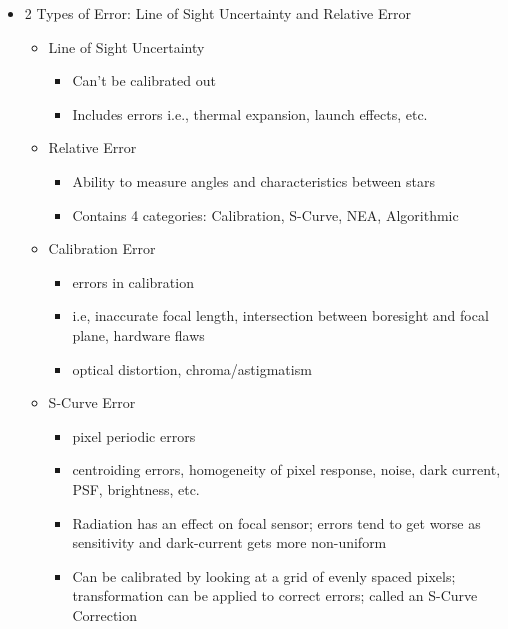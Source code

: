 \begin{itemize}
    \item 2 Types of Error: Line of Sight Uncertainty and Relative Error
    \begin{itemize}
        \item Line of Sight Uncertainty
        \begin{itemize}
            \item Can't be calibrated out
            \item Includes errors i.e., thermal expansion, launch effects, etc.
        \end{itemize}
    \end{itemize}
    \begin{itemize}
        \item Relative Error
        \begin{itemize}
            \item Ability to measure angles and characteristics between stars 
            \item Contains 4 categories: Calibration, S-Curve, NEA, Algorithmic
        \end{itemize}
    \end{itemize}
    \begin{itemize}
        \item Calibration Error
        \begin{itemize}
            \item errors in calibration
            \item i.e, inaccurate focal length, intersection between boresight and focal plane, hardware flaws
            \item optical distortion, chroma/astigmatism
        \end{itemize}
    \end{itemize}
    \begin{itemize}
        \item S-Curve Error
        \begin{itemize}
            \item pixel periodic errors
            \item centroiding errors, homogeneity of pixel response, noise, dark current, PSF, brightness, etc.
            \item Radiation has an effect on focal sensor; errors tend to get worse as sensitivity and dark-current gets more non-uniform
            \item Can be calibrated by looking at a grid of evenly spaced pixels; transformation can be applied to correct errors; called an S-Curve Correction

\end{itemize}
\end{itemize}
\end{itemize}
